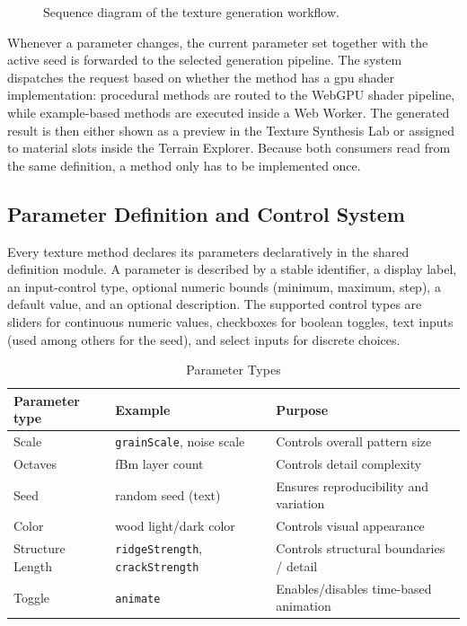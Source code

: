 \begin{figure}[H]
    \centering
    {Sequence diagram of the texture generation workflow.}
    \label{fig:dataflow-seq-dia}
\end{figure}

Whenever a parameter changes, the current parameter set together with the active seed is forwarded to the selected generation pipeline. The system dispatches the request based on whether the method has a \gls{gpu} shader implementation: procedural methods are routed to the WebGPU shader pipeline, while example-based methods are executed inside a Web Worker. The generated result is then either shown as a preview in the Texture Synthesis Lab or assigned to material slots inside the Terrain Explorer. Because both consumers read from the same definition, a method only has to be implemented once.

\clearpage
\subsection{Parameter Definition and Control System}

Every texture method declares its parameters declaratively in the shared definition module. A parameter is described by a stable identifier, a display label, an input-control type, optional numeric bounds (minimum, maximum, step), a default value, and an optional description. The supported control types are sliders for continuous numeric values, checkboxes for boolean toggles, text inputs (used among others for the seed), and select inputs for discrete choices.

\begin{table}[H]
    \centering
    \caption{Parameter Types}
    \label{tab:param-types}
    \begin{tabularx}{\textwidth}{|l|l|X|}
    \hline
    \textbf{Parameter type} & \textbf{Example} & \textbf{Purpose} \\
    \hline
    \hline
    
    Scale & \texttt{grainScale}, noise scale & Controls overall pattern size \\
    \hline

    Octaves & fBm layer count & Controls detail complexity \\
    \hline

    Seed & random seed (text) & Ensures reproducibility and variation \\
    \hline

    Color & wood light/dark color & Controls visual appearance \\
    \hline

    Structure Length & \texttt{ridgeStrength}, \texttt{crackStrength} & Controls structural boundaries / detail \\
    \hline

    Toggle & \texttt{animate} & Enables/disables time-based animation \\
    \hline
    
    \end{tabularx}
\end{table}

